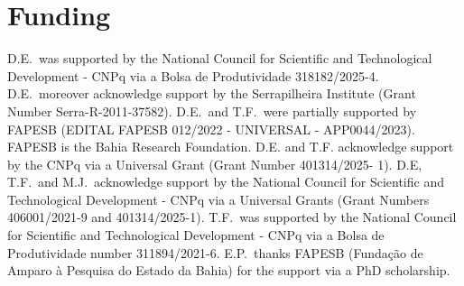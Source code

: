 \documentclass[12pt,a4paper]{article}
\theoremstyle{plain}
\theoremstyle{remark}
\begin{document}
	\section*{Funding}
	D.E.\ was supported by the National Council for Scientific and Technological Development - CNPq via a Bolsa de Produtividade  318182/2025-4. D.E.\ moreover acknowledge support by the Serrapilheira Institute (Grant Number Serra-R-2011-37582). D.E.\ and T.F.\ were  partially supported by FAPESB (EDITAL FAPESB  012/2022 - UNIVERSAL - APP0044/2023). FAPESB is the Bahia Research Foundation. D.E. and
	T.F. acknowledge support by the CNPq via a Universal Grant (Grant Number 401314/2025-
	1). D.E, T.F.\ and M.J.\  acknowledge support by the National Council for Scientific and Technological Development - CNPq via a Universal Grants (Grant Numbers 406001/2021-9 and 401314/2025-1). T.F.\ was supported by the National Council for Scientific and Technological Development - CNPq via a Bolsa de Produtividade number 311894/2021-6. E.P.\ thanks FAPESB (Funda\c c\~ao de Amparo \`a Pesquisa do Estado da Bahia) for the support via a PhD scholarship.
	
	
	\appendix
\end{document}
